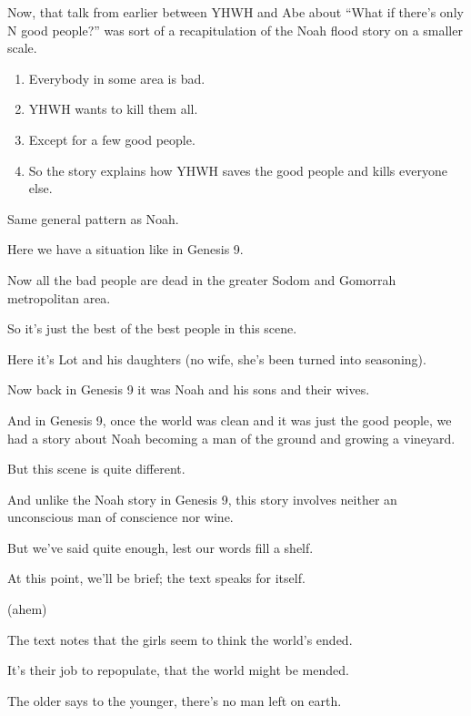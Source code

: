 {
}
{
}
{
	Now, that talk from earlier between YHWH and Abe about ``What if there's only N good people?'' was sort of a recapitulation of the Noah flood story on a smaller scale.

	\begin{enumerate}
	\item Everybody in some area is bad.
	\item YHWH wants to kill them all.
	\item Except for a few good people.
	\item So the story explains how YHWH saves the good people and kills everyone else.
	\end{enumerate}

	Same general pattern as Noah.

	Here we have a situation like in Genesis 9.

	Now all the bad people are dead in the greater Sodom and Gomorrah metropolitan area.

	So it's just the best of the best people in this scene.

	Here it's Lot and his daughters (no wife, she's been turned into seasoning).

	Now back in Genesis 9 it was Noah and his sons and their wives.

	And in Genesis 9, once the world was clean and it was just the good people, we had a story about Noah becoming a man of the ground and growing a vineyard.

	But this scene is quite different.

	And unlike the Noah story in Genesis 9, this story involves neither an unconscious man of conscience nor wine.

	But we've said quite enough, lest our words fill a shelf.

	At this point, we'll be brief; the text speaks for itself.

	(ahem)

	The text notes that the girls seem to think the world's ended.

	It's their job to repopulate, that the world might be mended.

	The older says to the younger, there's no man left on earth.
}

